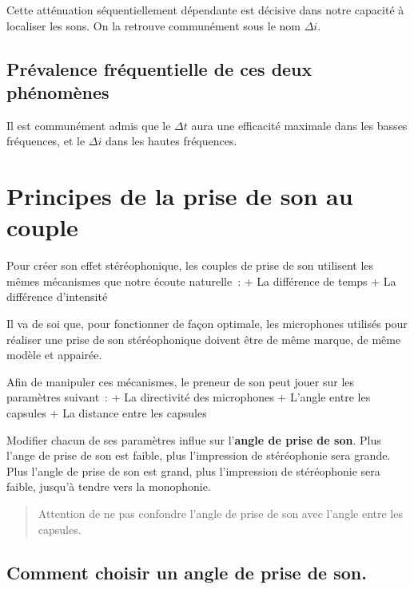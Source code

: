 \documentclass[
]{book}
\begin{document}
Cette atténuation séquentiellement dépendante est décisive dans notre capacité à localiser les sons. On la retrouve communément sous le nom \(\Delta i\).

\hypertarget{pruxe9valence-fruxe9quentielle-de-ces-deux-phuxe9nomuxe8nes}{%
\subsection{Prévalence fréquentielle de ces deux phénomènes}\label{pruxe9valence-fruxe9quentielle-de-ces-deux-phuxe9nomuxe8nes}}

Il est communément admis que le \(\Delta t\) aura une efficacité maximale dans les basses fréquences, et le \(\Delta i\) dans les hautes fréquences.

\hypertarget{principes-de-la-prise-de-son-au-couple}{%
\section{Principes de la prise de son au couple}\label{principes-de-la-prise-de-son-au-couple}}

Pour créer son effet stéréophonique, les couples de prise de son utilisent les mêmes mécanismes que notre écoute naturelle~:
+ La différence de temps
+ La différence d'intensité

Il va de soi que, pour fonctionner de façon optimale, les microphones utilisés pour réaliser une prise de son stéréophonique doivent être de même marque, de même modèle et appairée.

Afin de manipuler ces mécanismes, le preneur de son peut jouer sur les paramètres suivant~:
+ La directivité des microphones
+ L'angle entre les capsules
+ La distance entre les capsules

Modifier chacun de ses paramètres influe sur l'\textbf{angle de prise de son}. Plus l'ange de prise de son est faible, plus l'impression de stéréophonie sera grande. Plus l'angle de prise de son est grand, plus l'impression de stéréophonie sera faible, jusqu'à tendre vers la monophonie.

\begin{quote}
Attention de ne pas confondre l'angle de prise de son avec l'angle entre les capsules.
\end{quote}

\hypertarget{comment-choisir-un-angle-de-prise-de-son.}{%
\subsection{Comment choisir un angle de prise de son.}\label{comment-choisir-un-angle-de-prise-de-son.}}
\end{document}
